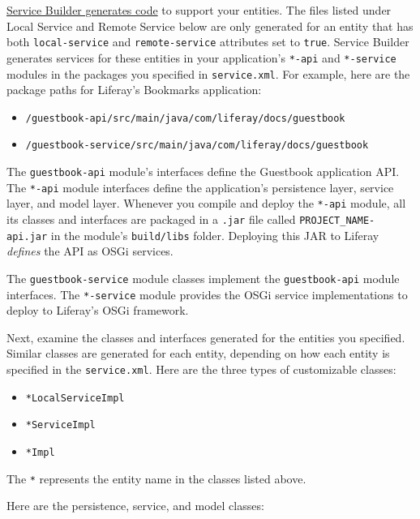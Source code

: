 \href{/docs/7-2/appdev/-/knowledge_base/a/running-service-builder}{Service
Builder generates code} to support your entities. The files listed under
Local Service and Remote Service below are only generated for an entity
that has both \texttt{local-service} and \texttt{remote-service}
attributes set to \texttt{true}. Service Builder generates services for
these entities in your application's \texttt{*-api} and
\texttt{*-service} modules in the packages you specified in
\texttt{service.xml}. For example, here are the package paths for
Liferay's Bookmarks application:

\begin{itemize}
\tightlist
\item
  \texttt{/guestbook-api/src/main/java/com/liferay/docs/guestbook}
\item
  \texttt{/guestbook-service/src/main/java/com/liferay/docs/guestbook}
\end{itemize}

The \texttt{guestbook-api} module's interfaces define the Guestbook
application API. The \texttt{*-api} module interfaces define the
application's persistence layer, service layer, and model layer.
Whenever you compile and deploy the \texttt{*-api} module, all its
classes and interfaces are packaged in a \texttt{.jar} file called
\texttt{PROJECT\_NAME-api.jar} in the module's \texttt{build/libs}
folder. Deploying this JAR to Liferay \emph{defines} the API as OSGi
services.

The \texttt{guestbook-service} module classes implement the
\texttt{guestbook-api} module interfaces. The \texttt{*-service} module
provides the OSGi service implementations to deploy to Liferay's OSGi
framework.

Next, examine the classes and interfaces generated for the entities you
specified. Similar classes are generated for each entity, depending on
how each entity is specified in the \texttt{service.xml}. Here are the
three types of customizable classes:

\begin{itemize}
\tightlist
\item
  \texttt{*LocalServiceImpl}
\item
  \texttt{*ServiceImpl}
\item
  \texttt{*Impl}
\end{itemize}

The \texttt{*} represents the entity name in the classes listed above.

Here are the persistence, service, and model classes:

